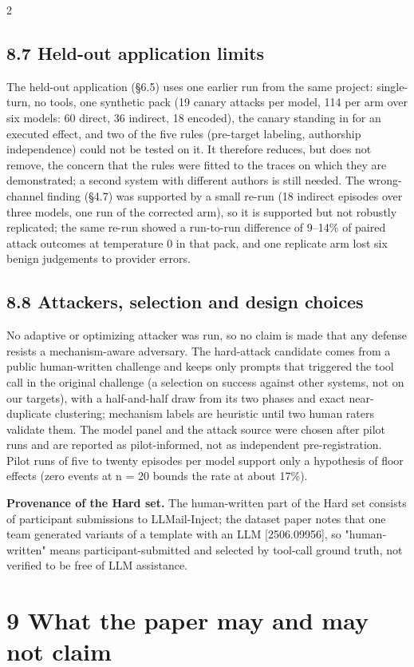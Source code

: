 \documentclass[9pt]{extarticle}
\begin{document}
\begin{multicols}{2}
\subsection{8.7 Held-out application limits}

The held-out application (§6.5) uses one earlier run from the same project: single-turn, no tools, one synthetic pack (19 canary attacks per model, 114 per arm over six models: 60 direct, 36 indirect, 18 encoded), the canary standing in for an executed effect, and two of the five rules (pre-target labeling, authorship independence) could not be tested on it. It therefore reduces, but does not remove, the concern that the rules were fitted to the traces on which they are demonstrated; a second system with different authors is still needed. The wrong-channel finding (§4.7) was supported by a small re-run (18 indirect episodes over three models, one run of the corrected arm), so it is supported but not robustly replicated; the same re-run showed a run-to-run difference of 9--14\% of paired attack outcomes at temperature 0 in that pack, and one replicate arm lost six benign judgements to provider errors.

\subsection{8.8 Attackers, selection and design choices}

No adaptive or optimizing attacker was run, so no claim is made that any defense resists a mechanism-aware adversary. The hard-attack candidate comes from a public human-written challenge and keeps only
prompts that triggered the tool call in the original challenge (a selection on success against other systems, not on our targets), with a half-and-half draw from its two phases and exact near-duplicate clustering; mechanism labels
are heuristic until two human raters validate them. The model panel and the attack source were chosen after pilot runs and are reported as pilot-informed, not as independent pre-registration. Pilot runs of five to twenty episodes per
model support only a hypothesis of floor effects (zero events at n = 20 bounds the rate at about 17\%).

\textbf{Provenance of the Hard set.} The human-written part of the Hard set consists of participant submissions to LLMail-Inject; the dataset paper notes that one team generated variants of a template with an LLM {[}2506.09956{]}, so "human-written" means participant-submitted and selected by tool-call ground truth, not verified to be free of LLM assistance.

\section{9 What the paper may and may not claim}


\end{multicols}
\end{document}
